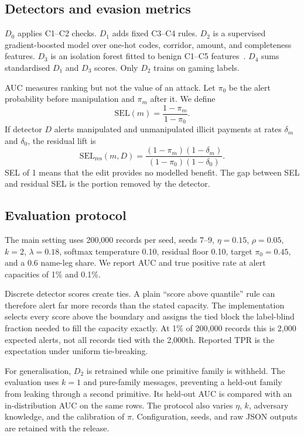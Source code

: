 \documentclass[conference]{IEEEtran}
\begin{document}
\subsection{Detectors and evasion metrics}
$D_0$ applies C1--C2 checks. $D_1$ adds fixed C3--C4 rules. $D_2$ is a
supervised gradient-boosted model over one-hot codes, corridor, amount, and
completeness features. $D_3$ is an isolation forest fitted to benign C1--C5
features~\cite{liu2008}. $D_4$ sums standardised $D_1$ and $D_3$ scores. Only
$D_2$ trains on gaming labels.

AUC measures ranking but not the value of an attack. Let $\pi_0$ be the alert
probability before manipulation and $\pi_m$ after it. We define
\begin{equation}
 \mathrm{SEL}(m)=\frac{1-\pi_m}{1-\pi_0}.
 \label{eq:sel}
\end{equation}
If detector $D$ alerts manipulated and unmanipulated illicit payments at rates
$\delta_m$ and $\delta_0$, the residual lift is
\begin{equation}
 \mathrm{SEL}_{\mathrm{res}}(m,D)=
 \frac{(1-\pi_m)(1-\delta_m)}{(1-\pi_0)(1-\delta_0)}.
 \label{eq:selres}
\end{equation}
SEL of 1 means that the edit provides no modelled benefit. The gap between
SEL and residual SEL is the portion removed by the detector.

\subsection{Evaluation protocol}
The main setting uses 200,000 records per seed, seeds 7--9, $\eta=0.15$,
$\rho=0.05$, $k=2$, $\lambda=0.18$, softmax temperature 0.10, residual floor
0.10, target $\pi_0=0.45$, and a 0.6 name-leg share. We report AUC and true
positive rate at alert capacities of 1\% and 0.1\%.

Discrete detector scores create ties. A plain ``score above quantile'' rule can
therefore alert far more records than the stated capacity. The implementation
selects every score above the boundary and assigns the tied block the
label-blind fraction needed to fill the capacity exactly. At 1\% of 200,000
records this is 2,000 expected alerts, not all records tied with the 2,000th.
Reported TPR is the expectation under uniform tie-breaking.

For generalisation, $D_2$ is retrained while one primitive family is withheld.
The evaluation uses $k=1$ and pure-family messages, preventing a held-out
family from leaking through a second primitive. Its held-out AUC is compared
with an in-distribution AUC on the same rows. The protocol also varies $\eta$,
$k$, adversary knowledge, and the calibration of $\pi$. Configuration, seeds,
and raw JSON outputs are retained with the release.
\end{document}
